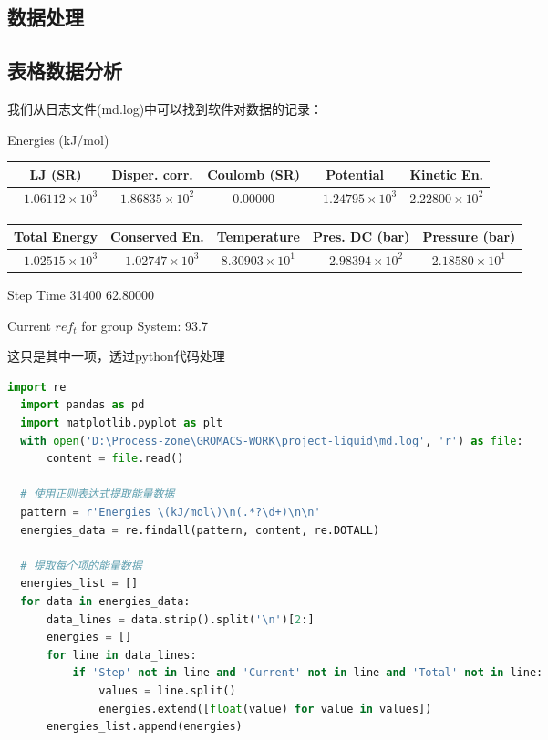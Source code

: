 \documentclass[12pt, a4paper, oneside]{ctexart}
\begin{document}
\begin{spacing}{2.0}
\section{数据处理}
\subsection{表格数据分析}
我们从日志文件(md.log)中可以找到软件对数据的记录：
\begin{center}
  Energies (kJ/mol)
  \begin{table}[h]
    \centering
    \begin{tabular}{|c|c|c|c|c|}
    \hline
    LJ (SR) & Disper. corr. & Coulomb (SR) & Potential & Kinetic En. \\
    \hline
    $-1.06112 \times 10^{3}$ & $-1.86835 \times 10^{2}$ & $0.00000$ & $-1.24795 \times 10^{3}$ & $2.22800 \times 10^{2}$ \\
    \hline
    \end{tabular}
    \end{table}
    
    \begin{table}[h]
    \centering
    \begin{tabular}{|c|c|c|c|c|}
    \hline
    Total Energy & Conserved En. & Temperature & Pres. DC (bar) & Pressure (bar) \\
    \hline
    $-1.02515 \times 10^{3}$ & $-1.02747 \times 10^{3}$ & $8.30903 \times 10^{1}$ & $-2.98394 \times 10^{2}$ & $2.18580 \times 10^{1}$ \\
    \hline
    \end{tabular}
    \end{table}

     Step           Time
    31400       62.80000

Current $ref_t$ for group System: 93.7
\end{center}
这只是其中一项，透过python代码处理
\begin{lstlisting}[language=python, caption={statistics}]
  import re
  import pandas as pd
  import matplotlib.pyplot as plt
  with open('D:\Process-zone\GROMACS-WORK\project-liquid\md.log', 'r') as file:
      content = file.read()
  
  # 使用正则表达式提取能量数据
  pattern = r'Energies \(kJ/mol\)\n(.*?\d+)\n\n'
  energies_data = re.findall(pattern, content, re.DOTALL)
  
  # 提取每个项的能量数据
  energies_list = []
  for data in energies_data:
      data_lines = data.strip().split('\n')[2:]
      energies = []
      for line in data_lines:
          if 'Step' not in line and 'Current' not in line and 'Total' not in line:
              values = line.split()
              energies.extend([float(value) for value in values])
      energies_list.append(energies)
  

\end{lstlisting}
\end{spacing}
\end{document}
